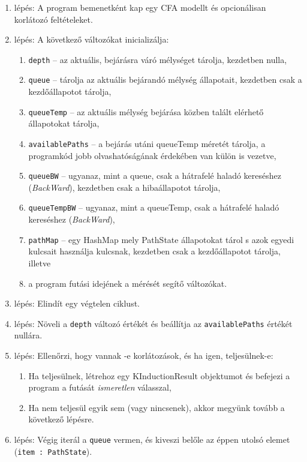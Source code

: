 \begin{enumerate}
	\item lépés: A program bemenetként kap egy CFA modellt és opcionálisan korlátozó feltételeket.
	\item lépés: A következő változókat inicializálja:
	\begin{enumerate}
		\item \texttt{depth} -- az aktuális, bejárásra váró mélységet tárolja, kezdetben nulla,
		\item \texttt{queue} -- tárolja az aktuális bejárandó mélység állapotait, kezdetben csak a kezdőállapotot tárolja,
		\item \texttt{queueTemp} -- az aktuális mélység bejárása közben talált elérhető állapotokat tárolja,
		\item \texttt{availablePaths} -- a bejárás utáni queueTemp méretét tárolja, a programkód jobb olvashatóságának érdekében van külön is vezetve,
		\item \texttt{queueBW} -- ugyanaz, mint a queue, csak a hátrafelé haladó kereséshez (\textit{BackWard}), kezdetben csak a hibaállapotot tárolja,
		\item \texttt{queueTempBW} -- ugyanaz, mint a queueTemp, csak a hátrafelé haladó kereséshez (\textit{BackWard}),
		\item \texttt{pathMap} -- egy HashMap mely PathState állapotokat tárol s azok egyedi kulcsait használja kulcsnak, kezdetben csak a kezdőállapotot tárolja, illetve
		\item a program futási idejének a mérését segítő változókat.
	\end{enumerate}
	\item lépés: Elindít egy végtelen ciklust.
	\item lépés: Növeli a \texttt{depth} változó értékét és beállítja az \texttt{availablePaths} értékét nullára.
	\item lépés: Ellenőrzi, hogy vannak -e korlátozások, és ha igen, teljesülnek-e:
	\begin{enumerate}
		\item Ha teljesülnek, létrehoz egy KInductionResult objektumot és befejezi a program a futását \textit{ismeretlen} válasszal,
		\item Ha nem teljesül egyik sem (vagy nincsenek), akkor megyünk tovább a következő lépésre.
	\end{enumerate}
	\item lépés: Végig iterál a \texttt{queue} vermen, és kiveszi belőle az éppen utolsó elemet (\texttt{item : PathState}).

\end{enumerate}

